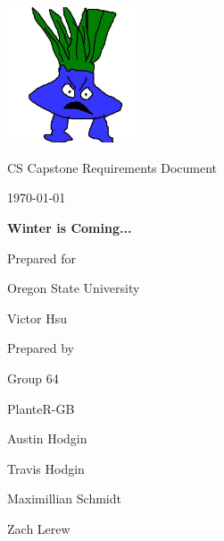 \documentclass[onecolumn, draftclsnofoot,10pt, compsoc]{IEEEtran}
\def \CapstoneTeamName{			              			 PlanteR-GB}
\def \CapstoneTeamNumber{					           			 Group 64}
\def \GroupMemberOne{				           				Austin Hodgin}
\def \GroupMemberTwo{				           				Travis Hodgin}
\def \GroupMemberThree{			            Maximillian Schmidt}
\def\GroupMemberFour{		        	               Zach Lerew}
\def \CapstoneProjectName{	      	    Winter is Coming...}
\def \CapstoneSponsorCompany{		    Oregon State University}
\def \CapstoneSponsorPerson{		 			  				 Victor Hsu}
\def \DocType{		%
				Requirements Document
				}
\newcommand{\NameSigPair}[1]{\par
\makebox[2.75in][r]{#1} \hfil 	\makebox[3.25in]{\makebox[2.25in]{\hrulefill} \hfill		\makebox[.75in]{\hrulefill}}
\par\vspace{-12pt} \textit{\tiny\noindent
\makebox[2.75in]{} \hfil		\makebox[3.25in]{\makebox[2.25in][r]{Signature} \hfill	\makebox[.75in][r]{Date}}}}
\renewcommand{\NameSigPair}[1]{#1}
\begin{document}
\begin{titlepage}
    \begin{singlespace}
        \hfill

        \includegraphics[height=4cm]{derp.jpg}

        \par\vspace{.2in}
        \centering
        \scshape{
            \huge CS Capstone \DocType \par
            {\large\today}\par
            \vspace{.5in}
            \textbf{\Huge\CapstoneProjectName}\par

						\vspace{1in}

            {\large Prepared for}\par
            \Huge \CapstoneSponsorCompany\par
            \vspace{5pt}
            {\Large\NameSigPair{\CapstoneSponsorPerson}\par}

						\vspace{1in}

            {\large Prepared by}\par
						{\huge \CapstoneTeamNumber}\par
            \CapstoneTeamName\par
            \vspace{5pt}

            {
							\Large
							\NameSigPair{\GroupMemberOne}\par
							\NameSigPair{\GroupMemberTwo}\par
							\NameSigPair{\GroupMemberThree}\par
							\NameSigPair{\GroupMemberFour}\par
            }

}
\end{singlespace}
\end{titlepage}
\end{document}
